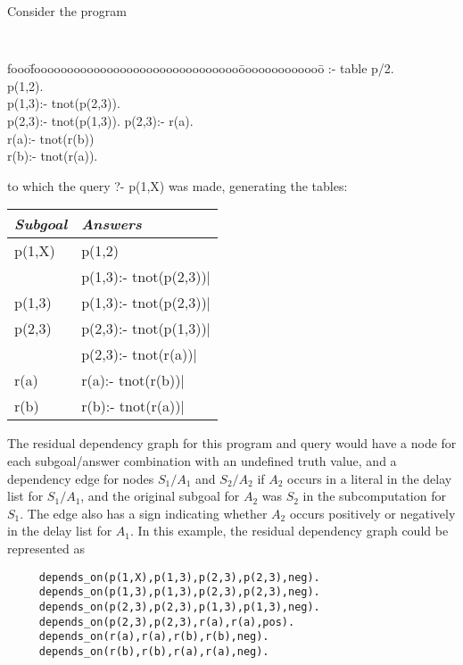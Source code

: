 \begin{description}
\begin{example} \rm
Consider the program 
% 
{\tt 
\begin{tabbing}
fooo\=fooooooooooooooooooooooooooooooo\=ooooooooooooo\=\kill
 \>  :- table p/2. \\
\>           p(1,2). \\
\>           p(1,3):- tnot(p(2,3)).  \\
\>           p(2,3):- tnot(p(1,3)). \> p(2,3):- r(a).\\
\>           r(a):- tnot(r(b)) \\
\>           r(b):- tnot(r(a)).   
\end{tabbing}
}
%
to which the query {?- p(1,X)} was made, generating the tables:
\begin{center}
\begin{tabular}{||l|l||}   \hline
     {\em Subgoal}                 & {\em Answers} \\ \hline \hline
     p(1,X)                     & p(1,2) \\ 
                                & p(1,3):- tnot(p(2,3))| \\ \hline
     p(1,3)                     & p(1,3):- tnot(p(2,3))| \\ \hline
     p(2,3)                     & p(2,3):- tnot(p(1,3))| \\ \hline
                                & p(2,3):- tnot(r(a))| \\ \hline
     r(a)                       & r(a):- tnot(r(b))| \\ \hline
     r(b)                       & r(b):- tnot(r(a))| \\ \hline
\end{tabular}
\end{center}

The residual dependency graph for this program and query would have a
node for each subgoal/answer combination with an undefined truth
value, and a dependency edge for nodes $S_1/A_1$ and $S_2/A_2$ if
$A_2$ occurs in a literal in the delay list for $S_1/A_1$, and the
original subgoal for $A_2$ was $S_2$ in the subcomputation for $S_1$.
The edge also has a sign indicating whether $A_2$ occurs positively or
negatively in the delay list for $A_1$.  In this example, the residual
dependency graph could be represented as 
%
\begin{verbatim}
     depends_on(p(1,X),p(1,3),p(2,3),p(2,3),neg).
     depends_on(p(1,3),p(1,3),p(2,3),p(2,3),neg).
     depends_on(p(2,3),p(2,3),p(1,3),p(1,3),neg).
     depends_on(p(2,3),p(2,3),r(a),r(a),pos).
     depends_on(r(a),r(a),r(b),r(b),neg).
     depends_on(r(b),r(b),r(a),r(a),neg).
\end{verbatim}
\end{example}


\end{description}
